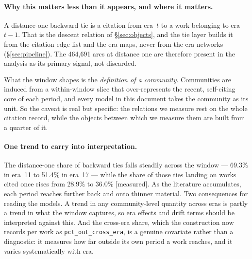 \documentclass[11pt]{article}
\newcommand{\meas}{{\footnotesize\textsf{[measured]}}}
\newcommand{\code}[1]{\texttt{\small #1}}
\begin{document}
\paragraph{Why this matters less than it appears, and where it matters.} A distance-one
backward tie is a citation from era~$t$ to a work belonging to era~$t-1$. That is the descent
relation of \S\ref{sec:objects}, and the tie layer builds it from the citation edge list and
the era maps, never from the era networks (\S\ref{sec:pipeline}). The 464{,}691 arcs at
distance one are therefore present in the analysis as its primary signal, not discarded.

What the window shapes is the \emph{definition of a community}. Communities are induced from
a within-window slice that over-represents the recent, self-citing core of each period, and
every model in this document takes the community as its unit. So the caveat is real but
specific: the relations we measure rest on the whole citation record, while the objects
between which we measure them are built from a quarter of it.

\paragraph{One trend to carry into interpretation.} The distance-one share of backward ties
falls steadily across the window --- 69.3\% in era~11 to 51.4\% in era~17 --- while the share
of those ties landing on works cited once rises from 28.9\% to 36.0\% \meas{}. As the
literature accumulates, each period reaches further back and onto thinner material. Two
consequences for reading the models. A trend in any community-level quantity across eras is
partly a trend in what the window captures, so era effects and drift terms should be
interpreted against this. And the cross-era share, which the construction now records per
work as \code{pct\_out\_cross\_era}, is a genuine covariate rather than a diagnostic: it
measures how far outside its own period a work reaches, and it varies systematically with
era.
\end{document}
